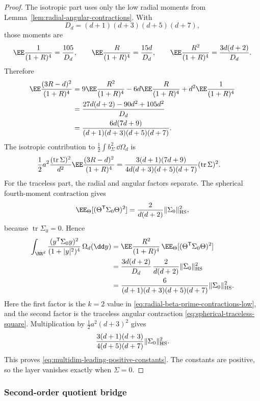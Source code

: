 \begin{proof}
The isotropic part uses only the low radial moments from
Lemma~\ref{lem:radial-angular-contractions}.  With
\[
  D_d=(d+1)(d+3)(d+5)(d+7),
\]
those moments are
\[
  \EE\frac1{(1+R)^4}=\frac{105}{D_d},\qquad
  \EE\frac{R}{(1+R)^4}=\frac{15d}{D_d},\qquad
  \EE\frac{R^2}{(1+R)^4}=\frac{3d(d+2)}{D_d}.
\]
Therefore
\[
\begin{aligned}
\EE\frac{(3R-d)^2}{(1+R)^4}
&=
9\EE\frac{R^2}{(1+R)^4}
-6d\EE\frac{R}{(1+R)^4}
+d^2\EE\frac1{(1+R)^4} \\
&=
\frac{27d(d+2)-90d^2+105d^2}{D_d} \\
&=
\frac{6d(7d+9)}
{(d+1)(d+3)(d+5)(d+7)} .
\end{aligned}
\]
The isotropic contribution to \(\frac12\int b_\Sigma^2\,\dd\Omega_d\) is
\[
\begin{aligned}
\frac12 a^2\frac{(\operatorname{tr}\Sigma)^2}{d^2}
\EE\frac{(3R-d)^2}{(1+R)^4}
&=
\frac{3(d+1)(7d+9)}
{4d(d+3)(d+5)(d+7)}
(\operatorname{tr}\Sigma)^2 .
\end{aligned}
\]
For the traceless part, the radial and angular factors separate.  The
spherical fourth-moment contraction gives
\[
\EE_\Theta[(\Theta^{\mathsf T}\Sigma_0\Theta)^2]
=\frac{2}{d(d+2)}\|\Sigma_0\|_{\rm HS}^2,
\]
because \(\operatorname{tr}\Sigma_0=0\).  Hence
\[
\begin{aligned}
\int_{\RR^d}
\frac{(y^{\mathsf T}\Sigma_0y)^2}{(1+|y|^2)^4}\,\Omega_d(\dd y)
&=
\EE\frac{R^2}{(1+R)^4}\,
\EE_\Theta[(\Theta^{\mathsf T}\Sigma_0\Theta)^2] \\
&=
\frac{3d(d+2)}{D_d}\,
\frac{2}{d(d+2)}
\|\Sigma_0\|_{\rm HS}^2 \\
&=
\frac{6}{(d+1)(d+3)(d+5)(d+7)}
\|\Sigma_0\|_{\rm HS}^2 .
\end{aligned}
\]
Here the first factor is the \(k=2\) value in
\eqref{eq:radial-beta-prime-contractions-low}, and the second factor is the
traceless angular contraction
\eqref{eq:spherical-traceless-square}.
Multiplication by \(\frac12a^2(d+3)^2\) gives
\[
\frac{3(d+1)(d+3)}{4(d+5)(d+7)}
\|\Sigma_0\|_{\rm HS}^2 .
\]
This proves \eqref{eq:multidim-leading-positive-constants}.  The constants are
positive, so the layer vanishes exactly when \(\Sigma=0\).
\end{proof}
\fi

\subsubsection*{Second-order quotient bridge}\leavevmode\par\smallskip

